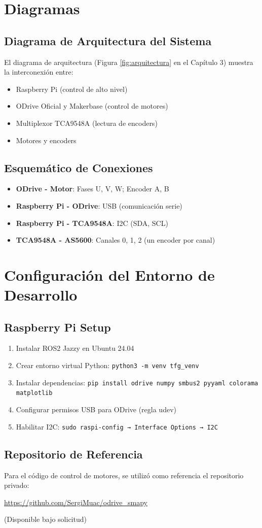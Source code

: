 \section{Diagramas}

\subsection{Diagrama de Arquitectura del Sistema}
El diagrama de arquitectura (Figura \ref{fig:arquitectura} en el Capítulo 3) muestra la interconexión entre:
\begin{itemize}
    \item Raspberry Pi (control de alto nivel)
    \item ODrive Oficial y Makerbase (control de motores)
    \item Multiplexor TCA9548A (lectura de encoders)
    \item Motores y encoders
\end{itemize}

\subsection{Esquemático de Conexiones}
\begin{itemize}
    \item \textbf{ODrive - Motor}: Fases U, V, W; Encoder A, B
    \item \textbf{Raspberry Pi - ODrive}: USB (comunicación serie)
    \item \textbf{Raspberry Pi - TCA9548A}: I2C (SDA, SCL)
    \item \textbf{TCA9548A - AS5600}: Canales 0, 1, 2 (un encoder por canal)
\end{itemize}

\section{Configuración del Entorno de Desarrollo}

\subsection{Raspberry Pi Setup}
\begin{enumerate}
    \item Instalar ROS2 Jazzy en Ubuntu 24.04
    \item Crear entorno virtual Python: \texttt{python3 -m venv tfg\_venv}
    \item Instalar dependencias: \texttt{pip install odrive numpy smbus2 pyyaml colorama matplotlib}
    \item Configurar permisos USB para ODrive (regla udev)
    \item Habilitar I2C: \texttt{sudo raspi-config → Interface Options → I2C}
\end{enumerate}

\subsection{Repositorio de Referencia}
Para el código de control de motores, se utilizó como referencia el repositorio privado:
\begin{center}
\url{https://github.com/SergiMuac/odrive_smapy}
\end{center}
(Disponible bajo solicitud)
